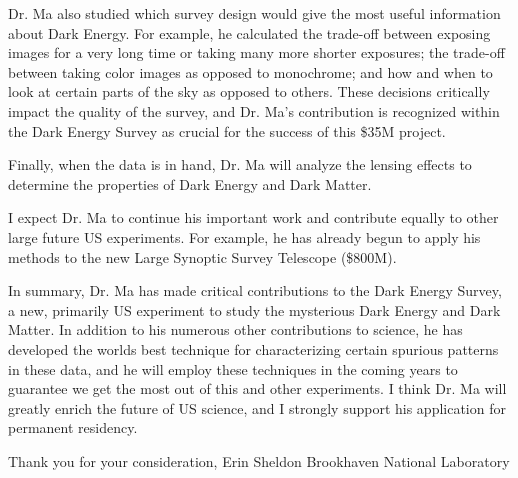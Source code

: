 \documentclass[12pt]{letter}
\begin{document}
Dr. Ma also studied which survey design would give the most useful information
about Dark Energy.  For example, he calculated the trade-off between exposing
images for a very long time or taking many more shorter exposures; the
trade-off between taking color images as opposed to monochrome; and how and
when to look at certain parts of the sky as opposed to others.  These decisions
critically impact the quality of the survey, and Dr. Ma's contribution is
recognized within the Dark Energy Survey as crucial for the success of this
\$35M project.

Finally, when the data is in hand, Dr. Ma will analyze the lensing effects
to determine the properties of Dark Energy and Dark Matter.

I expect Dr. Ma to continue his important work and contribute equally to other
large future US experiments.  For example, he has already begun to apply his
methods to the new Large Synoptic Survey Telescope (\$800M). 

In summary, Dr. Ma has made critical contributions to the Dark Energy Survey, a
new, primarily US experiment to study the mysterious Dark Energy and Dark
Matter.  In addition to his numerous other contributions to science, he has
developed the worlds best technique for characterizing certain spurious
patterns in these data, and he will employ these techniques in the coming years
to guarantee we get the most out of this and other experiments.     I think Dr.
Ma will greatly enrich the future of US science, and I strongly support his
application for permanent residency. 

{\noindent Thank you for your consideration,}
\newline
\newline
{\noindent Erin Sheldon}
\newline
{\noindent Brookhaven National Laboratory}
\end{document}
